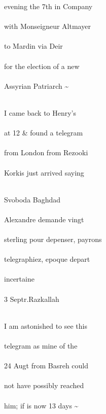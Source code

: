 \documentclass{report}
\begin{document}


	\par{
 	evening the 7th in Company\ \\\ \\with Monseigneur Altmayer\ \\\ \\to Mardin via Deir\ \\\ \\for the election of a new\ \\\ \\Assyrian Patriarch \~{}\ \\\ \\
	}

	\par{
 	I came back to Henry’s\ \\\ \\at 12 \& found a telegram\ \\\ \\from London from Rezooki\ \\\ \\Korkis just arrived saying\ \\\ \\
	}

	\par{
 	Svoboda Baghdad\ \\\ \\Alexandre demande vingt\ \\\ \\sterling pour depenser, payrons\ \\\ \\telegraphiez, epoque depart\ \\\ \\incertaine\ \\\ \\3 Septr.Razkallah\ \\\ \\
	}

	\par{
 	I am astonished to see this\ \\\ \\telegram as mine of the\ \\\ \\24 Augt from Basreh could\ \\\ \\not have possibly reached\ \\\ \\him; if is now 13 days \~{}\ \\\ \\
	}
\end{document}
